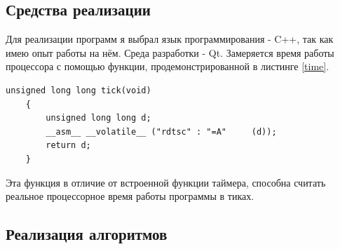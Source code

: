 \documentclass[a4paper, 14pt]{article}
\begin{document}
	\subsection{Средства реализации}
	\hspace{1cm}Для реализации программ я выбрал язык программирования - C++, так как имею опыт работы на нём. Среда разработки - Qt. Замеряется время работы процессора с помощью функции, продемонстрированной в листинге \ref{time}.
	\begin{lstlisting}[label=time,caption=Функция замера процессороного времени]
    unsigned long long tick(void)
    {
        unsigned long long d;
        __asm__ __volatile__ ("rdtsc" : "=A"     (d));
        return d;
    }
	\end{lstlisting}
	Эта функция в отличие от встроенной функции таймера, способна считать реальное процессорное время работы программы в тиках\cite{lom}.

	\newpage
	\subsection{Реализация алгоритмов}
	
\end{document}
